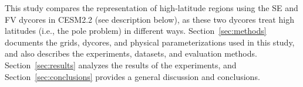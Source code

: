 \documentclass[draft]{agujournal2019}
\begin{document}
This study compares the representation of high-latitude regions using the SE and FV dycores in CESM2.2 (see description below), as these two dycores treat high latitudes (i.e., the pole problem) in different ways. Section~\ref{sec:methods} documents the grids, dycores, and physical parameterizations used in this study, and also describes the experiments, datasets, and evaluation methods. Section~\ref{sec:results} analyzes the results of the experiments, and Section~\ref{sec:conclusions} provides a general discussion and conclusions.



\end{document}
